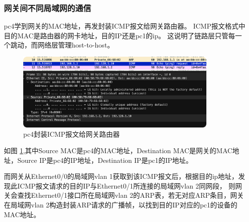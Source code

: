 \documentclass[a4paper,12pt]{report}
\begin{document}
\begin{spacing}{1.5}
\subsubsection{网关间不同局域网的通信}
pc4学到网关的MAC地址，再发封装ICMP报文给网关路由器。
ICMP报文格式中目的MAC是路由器的网卡地址，目的IP还是pc1的ip。
这说明了链路层只管每一个跳动，而网络层管理host-to-host。
\begin{figure}[htb!]
  \centering
\includegraphics[width=10cm]{figure/icmp_168.png}
\caption{pc4封装ICMP报文给网关路由器}
\label{pic:icmp168}
\end{figure}
如图 \ref{pic:icmp168},其中Source MAC是pc4的MAC地址，Destination MAC是网关的MAC地址，Source IP是pc4的IP地址，Destination IP是pc1的IP地址。

而网关从Ethernet0/0的局域网vlan 1获取到该ICMP报文后，根据目的ip地址，发现此ICMP报文请求的目的IP与Ethernet0/1所连接的局域网vlan 2同网段，
则网关会查找Ethernet0/1接口所在局域网vlan 2的ARP表，若无对应ARP条目，网关在局域网vlan 2构造封装ARP请求的广播帧，以找到目的IP对应的pc1的设备的MAC地址。


\end{spacing}
\end{document}
